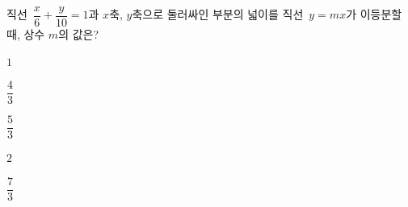 직선~$\dfrac{x}{6}+\dfrac{y}{10}=1$과 $x$축, $y$축으로 둘러싸인 부분의 넓이를 직선~$y=mx$가 이등분할 때, 상수 $m$의 값은?
\begin{choices32}{\rule[-3ex]{0pt}{8ex}$1$}{\rule[-3ex]{0pt}{8ex}$\dfrac{4}{3}$}{\rule[-3ex]{0pt}{8ex}$\dfrac{5}{3}$}{\rule[-3ex]{0pt}{8ex}$2$}{\rule[-3ex]{0pt}{8ex}$\dfrac{7}{3}$}\end{choices32}
